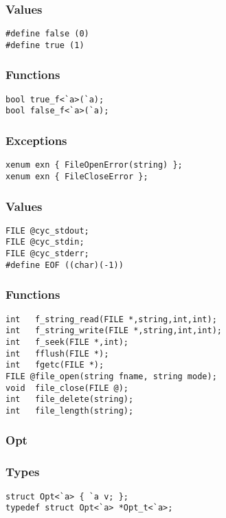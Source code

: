 \subsubsection*{Values}
\begin{verbatim}
#define false (0)
#define true (1)
\end{verbatim}

\subsubsection*{Functions}
\begin{verbatim}
bool true_f<`a>(`a);
bool false_f<`a>(`a);
\end{verbatim}

\subsubsection*{Exceptions}
\begin{verbatim}
xenum exn { FileOpenError(string) };
xenum exn { FileCloseError };
\end{verbatim}

\subsubsection*{Values}
\begin{verbatim}
FILE @cyc_stdout;
FILE @cyc_stdin;
FILE @cyc_stderr;
#define EOF ((char)(-1))
\end{verbatim}

\subsubsection*{Functions}
\begin{verbatim}
int   f_string_read(FILE *,string,int,int);
int   f_string_write(FILE *,string,int,int);
int   f_seek(FILE *,int);
int   fflush(FILE *);
int   fgetc(FILE *);
FILE @file_open(string fname, string mode);
void  file_close(FILE @);
int   file_delete(string);
int   file_length(string);
\end{verbatim}

\subsubsection*{Opt}
\subsubsection*{Types}
\begin{verbatim}
struct Opt<`a> { `a v; };
typedef struct Opt<`a> *Opt_t<`a>;
\end{verbatim}

